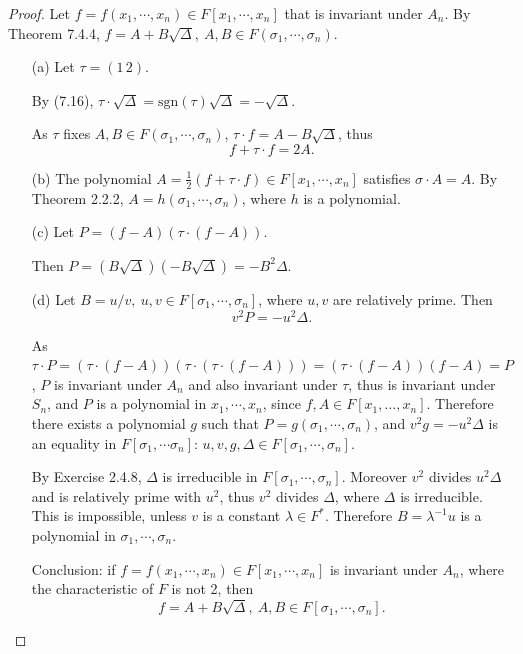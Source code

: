 \documentclass[11pt,a4paper]{article}
\begin{document}
\begin{proof}
Let  $f = f(x_1,\cdots,x_n) \in F[x_1,\cdots,x_n]$ that is invariant under $A_n$.
By Theorem 7.4.4, $f=A + B\sqrt{\Delta}, \ A,B \in F(\sigma_1,\cdots,\sigma_n)$.
\begin{enumerate}
\item[(a)] Let $\tau = (1\, 2)$.

By (7.16),  $\tau \cdot\sqrt{\Delta} = \mathrm{sgn}(\tau) \sqrt{\Delta} = - \sqrt{\Delta}$.

As $\tau$  fixes $A,B \in F(\sigma_1,\cdots,\sigma_n)$, $\tau \cdot f = A - B \sqrt{\Delta}$, thus
$$f + \tau \cdot f = 2 A.$$

\item[(b)] The polynomial $A =\frac{1}{2} (  f + \tau \cdot f) \in F[x_1,\cdots,x_n]$ satisfies $\sigma \cdot A = A$. By Theorem 2.2.2, $A = h(\sigma_1, \cdots,\sigma_n)$, where $h$ is a polynomial. 

\item[(c)] Let $P = (f-A)(\tau\cdot(f-A))$.

Then $P = (B\sqrt{\Delta})(-B \sqrt{\Delta}) = -B^2 \Delta$.

\item[(d)] Let $B = u/v, \ u,v \in F[\sigma_1,\cdots,\sigma_n]$, where $u,v$ are relatively prime. Then $$v^2 P = -u^2 \Delta.$$

As $\tau \cdot P = (\tau\cdot(f-A))(\tau \cdot(\tau\cdot(f-A))) = (\tau\cdot(f-A))(f-A) = P$, $P$ is invariant under $A_n$ and also invariant under $\tau$, thus is invariant under $S_n$, and $P$ is a polynomial in $x_1,\cdots,x_n$, since $f, A \in F[x_1,\ldots,x_n]$. Therefore there exists a polynomial $g$ such that $P = g(\sigma_1, \cdots, \sigma_n)$, and 
$v^2 g = -u^2 \Delta$ is an equality in $F[\sigma_1, \cdots \sigma_n]$: $u,v,g,\Delta \in F[\sigma_1,\cdots,\sigma_n]$.

By Exercise 2.4.8, $\Delta$ is irreducible in $F[\sigma_1,\cdots, \sigma_n]$. Moreover $v^2$ divides $u^2 \Delta$ and is relatively prime with $u^2$, thus $v^2$ divides $\Delta$, where $\Delta$ is irreducible. This is impossible, unless $v$ is a constant $\lambda \in F^*$. Therefore $B = \lambda^{-1} u$ is a polynomial in $\sigma_1,\cdots,\sigma_n$.

Conclusion: if  $f = f(x_1,\cdots,x_n) \in F[x_1,\cdots,x_n]$ is invariant under $A_n$, where the characteristic of $F$ is not 2,
then  $$f=A + B\sqrt{\Delta}, \ A,B \in F[\sigma_1,\cdots,\sigma_n].$$

\end{enumerate}
\end{proof}
\end{document}
